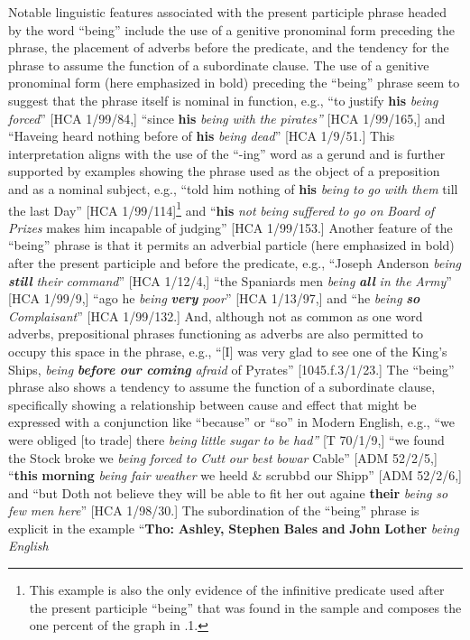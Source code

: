   Notable linguistic features associated with the present participle phrase headed by the word “being” include the use of a genitive pronominal form preceding the phrase, the placement of adverbs before the predicate, and the tendency for the phrase to assume the function of a subordinate clause. The use of a genitive pronominal form (here emphasized in bold) preceding the “being” phrase seem to suggest that the phrase itself is nominal in function, e.g., “to justify \textbf{his} \textit{being} \textit{forced}” [HCA 1/99/84,] “since \textbf{his} \textit{being} \textit{with} \textit{the} \textit{pirates”} [HCA 1/99/165,] and “Haveing heard nothing before of \textbf{his} \textit{being} \textit{dead}” [HCA 1/9/51.] This interpretation aligns with the use of the “-ing” word as a gerund and is further supported by examples showing the phrase used as the object of a preposition and as a nominal subject, e.g., “told him nothing of \textbf{his} \textit{being} \textit{to} \textit{go} \textit{with} \textit{them} till the last Day” [HCA 1/99/114]\footnote{This example is also the only evidence of the infinitive predicate used after the present participle “being” that was found in the sample and composes the one percent of the graph in .1.}  and “\textbf{his} \textit{not} \textit{being} \textit{suffered} \textit{to} \textit{go} \textit{on} \textit{Board} \textit{of} \textit{Prizes} makes him incapable of judging” [HCA 1/99/153.]  Another feature of the “being” phrase is that it permits an adverbial particle (here emphasized in bold) after the present participle and before the predicate, e.g., “Joseph Anderson \textit{being} \textbf{\textit{still}} \textit{their} \textit{command}” [HCA 1/12/4,] “the Spaniards men \textit{being} \textbf{\textit{all}} \textit{in} \textit{the} \textit{Army}” [HCA 1/99/9,] “ago he \textit{being} \textbf{\textit{very}} \textit{poor}” [HCA 1/13/97,] and “he \textit{being} \textbf{\textit{so}} \textit{Complaisant}” [HCA 1/99/132.] And, although not as common as one word adverbs, prepositional phrases functioning as adverbs are also permitted to occupy this space in the phrase, e.g., “[I] was very glad to see one of the King’s Ships, \textit{being} \textbf{\textit{before} \textit{our} \textit{coming}} \textit{afraid} of Pyrates” [1045.f.3/1/23.] The “being” phrase also shows a tendency to assume the function of a subordinate clause, specifically showing a relationship between cause and effect that might be expressed with a conjunction like “because” or “so” in Modern English, e.g., “we were obliged [to trade] there \textit{being} \textit{little} \textit{sugar} \textit{to} \textit{be} \textit{had”} [T 70/1/9,] “we found the Stock broke we \textit{being} \textit{forced} \textit{to} \textit{Cutt} \textit{our} \textit{best} \textit{bowar} Cable” [ADM 52/2/5,] “\textbf{this} \textbf{morning} \textit{being} \textit{fair} \textit{weather} we heeld \& scrubbd our Shipp” [ADM 52/2/6,] and “but Doth not believe they will be able to fit her out againe \textbf{their} \textit{being} \textit{so} \textit{few} \textit{men} \textit{here}” [HCA 1/98/30.] The subordination of the “being” phrase is explicit in the example “\textbf{Tho:} \textbf{Ashley,} \textbf{Stephen} \textbf{Bales} \textbf{and} \textbf{John} \textbf{Lother} \textit{being} \textit{English} 